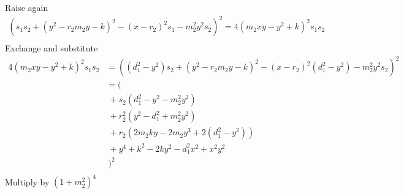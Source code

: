 \documentclass[11pt]{article}
\begin{document}
Raise again
\begin{align*}
  (s_1 s_2 + (y^2 - r_2 m_2 y - k)^2 - (x - r_2)^2 s_1 - m_2^2 y^2 s_2)^2 = 4 (m_2 x y - y^2 + k)^2 s_1 s_2\\
\end{align*}
Exchange and substitute
\begin{align*}
  4 (m_2 x y - y^2 + k)^2 s_1 s_2
  &= ((d_1^2 - y^2) s_2 + (y^2 - r_2 m_2 y - k)^2 - (x - r_2)^2 (d_1^2 - y^2) - m_2^2 y^2 s_2)^2\\
  &= (\\
  & ~+ s_2 (d_1^2 - y^2 - m_2^2 y^2)\\
  & ~+ r_2^2 (y^2 - d_1^2 + m_2^2 y^2)\\
  & ~+ r_2 (2 m_2 k y - 2 m_2 y^3 + 2 (d_1^2 - y^2))\\
  & ~+ y^4 + k^2 - 2 k y^2 - d_1^2 x^2 + x^2 y^2\\
  & ~)^2\\
\end{align*}
Multiply by $(1 + m_2^2)^4$
\end{document}
